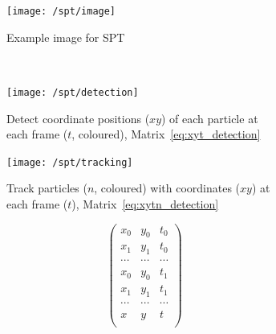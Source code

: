 
\begin{figure}
    \centering
    \begin{subfigure}[t]{0.4\linewidth}
            \centering
            \texttt{[image: /spt/image]}
            \caption{Example image for \gls{SPT}}
    \end{subfigure}\\\vspace{\abovecaptionskip}
    \begin{subfigure}[t]{0.45\linewidth}
            \centering
            \texttt{[image: /spt/detection]}
            \caption{
                Detect coordinate positions (\(xy\)) of each particle at each frame (\(t\), coloured), Matrix~\eqref{eq:xyt_detection}
            }\label{fig:spt/detection}
    \end{subfigure}\quad
    \begin{subfigure}[t]{0.45\linewidth}
            \centering
            \texttt{[image: /spt/tracking]}
            \caption{
                Track particles (\(n\), coloured) with coordinates (\(xy\)) at each frame (\(t\)), Matrix~\eqref{eq:xytn_detection}
            }\label{fig:spt/tracking}
    \end{subfigure}
    \caption{Routine for detecting and tracking particles.}\label{fig:particle_track}
    \begin{subfigure}[t]{0.45\linewidth}
        \centering
        \begin{equation}
            \begin{pmatrix}
              x_0 & y_0 & t_0 \\
              x_1 & y_1 & t_0 \\
              \cdots & \cdots & \cdots \\
              x_0 & y_0 & t_1 \\
              x_1 & y_1 & t_1 \\
              \cdots & \cdots & \cdots \\
              x & y & t \\
          \end{pmatrix}\label{eq:xyt_detection}
        \end{equation}
    \end{subfigure}\quad
    \begin{subfigure}[t]{0.45\linewidth}

\end{subfigure}
\end{figure}
